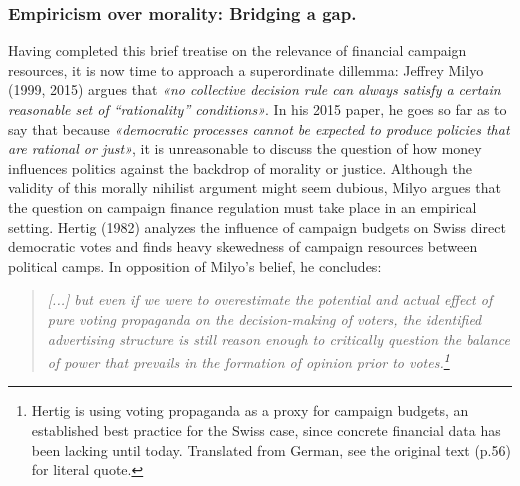 \documentclass[11pt,a4paper]{article}
\begin{document}
\subsubsection{Empiricism over morality: Bridging a gap.}
Having completed this brief treatise on the relevance of financial campaign resources, it is now time to approach a superordinate dillemma: Jeffrey Milyo (1999, 2015) argues that \textit{«no collective decision rule can always satisfy a certain reasonable set of “rationality” conditions»}. In his 2015 paper, he goes so far as to say that because \textit{«democratic processes cannot be expected to produce policies that are rational or just»}, it is unreasonable to discuss the question of how money influences politics against the backdrop of morality or justice. Although the validity of this morally nihilist argument might seem dubious, Milyo argues that the question on campaign finance regulation must take place in an empirical setting. Hertig (1982) analyzes the influence of campaign budgets on Swiss direct democratic votes and finds heavy skewedness of campaign resources between political camps. In opposition of Milyo’s belief, he concludes:
\begin{quote}
\textit{[...] but even if we were to overestimate the potential and actual effect of pure voting propaganda on the decision-making of voters, the identified advertising structure is still reason enough to critically question the balance of power that prevails in the formation of opinion prior to votes.\footnote{ Hertig is using voting propaganda as a proxy for campaign budgets, an established best practice for the Swiss case, since concrete financial data has been lacking until today. Translated from German, see the original text (p.56) for literal quote.}}
\end{quote}
\end{document}
